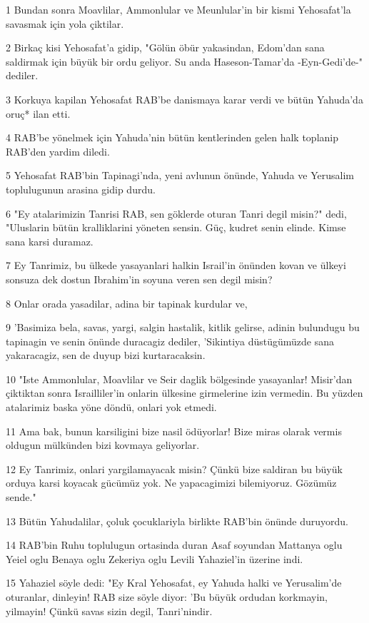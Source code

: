 \par 1 Bundan sonra Moavlilar, Ammonlular ve Meunlular'in bir kismi Yehosafat'la savasmak için yola çiktilar.
\par 2 Birkaç kisi Yehosafat'a gidip, "Gölün öbür yakasindan, Edom'dan sana saldirmak için büyük bir ordu geliyor. Su anda Haseson-Tamar'da -Eyn-Gedi'de-" dediler.
\par 3 Korkuya kapilan Yehosafat RAB'be danismaya karar verdi ve bütün Yahuda'da oruç* ilan etti.
\par 4 RAB'be yönelmek için Yahuda'nin bütün kentlerinden gelen halk toplanip RAB'den yardim diledi.
\par 5 Yehosafat RAB'bin Tapinagi'nda, yeni avlunun önünde, Yahuda ve Yerusalim toplulugunun arasina gidip durdu.
\par 6 "Ey atalarimizin Tanrisi RAB, sen göklerde oturan Tanri degil misin?" dedi, "Uluslarin bütün kralliklarini yöneten sensin. Güç, kudret senin elinde. Kimse sana karsi duramaz.
\par 7 Ey Tanrimiz, bu ülkede yasayanlari halkin Israil'in önünden kovan ve ülkeyi sonsuza dek dostun Ibrahim'in soyuna veren sen degil misin?
\par 8 Onlar orada yasadilar, adina bir tapinak kurdular ve,
\par 9 'Basimiza bela, savas, yargi, salgin hastalik, kitlik gelirse, adinin bulundugu bu tapinagin ve senin önünde duracagiz dediler, 'Sikintiya düstügümüzde sana yakaracagiz, sen de duyup bizi kurtaracaksin.
\par 10 "Iste Ammonlular, Moavlilar ve Seir daglik bölgesinde yasayanlar! Misir'dan çiktiktan sonra Israilliler'in onlarin ülkesine girmelerine izin vermedin. Bu yüzden atalarimiz baska yöne döndü, onlari yok etmedi.
\par 11 Ama bak, bunun karsiligini bize nasil ödüyorlar! Bize miras olarak vermis oldugun mülkünden bizi kovmaya geliyorlar.
\par 12 Ey Tanrimiz, onlari yargilamayacak misin? Çünkü bize saldiran bu büyük orduya karsi koyacak gücümüz yok. Ne yapacagimizi bilemiyoruz. Gözümüz sende."
\par 13 Bütün Yahudalilar, çoluk çocuklariyla birlikte RAB'bin önünde duruyordu.
\par 14 RAB'bin Ruhu toplulugun ortasinda duran Asaf soyundan Mattanya oglu Yeiel oglu Benaya oglu Zekeriya oglu Levili Yahaziel'in üzerine indi.
\par 15 Yahaziel söyle dedi: "Ey Kral Yehosafat, ey Yahuda halki ve Yerusalim'de oturanlar, dinleyin! RAB size söyle diyor: 'Bu büyük ordudan korkmayin, yilmayin! Çünkü savas sizin degil, Tanri'nindir.
